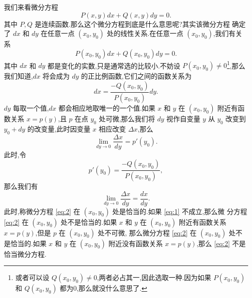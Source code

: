 \documentclass[a4paper, 12pt]{article} %
\begin{document}
\begin{CJK}{UTF8}{gbsn}
\ni 我们来看微分方程
\begin{equation}
  \label{eq:2}
  P(x,y)dx+Q(x,y)dy=0.
\end{equation}
其中 $P,Q$ 是连续函数.那么这个微分方程到底是什么意思呢?其实该微分方程
确定了 $dx$ 和 $dy$ 在任意一点 $(x_{0},y_0)$ 处的线性关系.在任意一点
$(x_0,y_0)$,我们有关系
$$
P(x_0,y_0)dx+Q(x_0,y_0)dy=0.
$$
其中 $dx$ 和 $dy$ 都是变化的实数,只是通常选的比较小.不妨设 $P(x_0,y_0)\neq 0$\footnote{或者可以设
$Q(x_0,y_0)\neq 0$,两者必占其一,因此选取一种.因为如果 $P(x_0,y_0)$ 和 $Q(x_0,y_0)$ 都为0,那么就没什么意思了.},那么我们知道,$dx$ 将会成为 $dy$ 的正比例函数,它们之间的函数关系为
$$
dx=\frac{-Q(x_0,y_0)}{P(x_0,y_0)}dy.
$$
$dy$ 每取一个值,$dx$ 都会相应地取唯一的一个值.如果 $x$ 和 $y$ 在
$(x_0,y_0)$ 附近有函数关系 $x=p(y)$,且 $p$ 在点 $y_0$ 处可微,那么我们将 $dy$ 视作自变量
$y$ 从 $y_0$ 改变到 $y_0+dy$ 的改变量,此时因变量 $x$ 相应改变 $\Delta x$,那么
$$
\lim_{dy\to 0}\frac{\Delta x}{dy}=p'(y_{0}).
$$
此时,令
\begin{equation}
  \label{eq:1}
  p'(y_0)=\frac{-Q(x_0,y_0)}{P(x_0,y_0)},
\end{equation}
那么我们有
$$
\lim_{dy\to 0}\frac{\Delta x}{dy}=\frac{dx}{dy}.
$$
此时,称微分方程 \eqref{eq:2} 在 $(x_0,y_0)$ 处是恰当的.如果 \eqref{eq:1} 不成立,那么微
分方程 \eqref{eq:2} 在 $(x_0,y_0)$ 处不是恰当的.如果 $x$ 和 $y$ 在
$(x_0,y_0)$ 附近有函数关系 $x=p(y)$,但是 $p$ 在 $(x_0,y_0)$ 处不可微,
那么微分方程 \eqref{eq:2} 在 $(x_0,y_0)$ 处不是恰当的.如果 $x$ 和 $y$ 在 $(x_0,y_0)$ 附近没有函数关系 $x=p(y)$,那么 \eqref{eq:2} 不是恰当微分方程.






  
  
  
  
  
\end{CJK}
\end{document}
